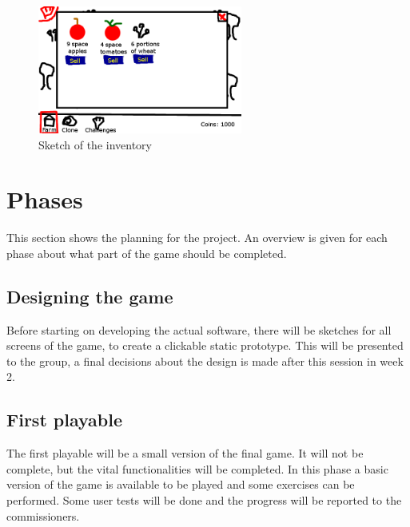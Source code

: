 \documentclass[a4paper,11pt,notitlepage]{report}
\begin{document}
\begin{figure}[h]
	\centering
		\includegraphics[width=0.60\textwidth]{Images/sketch-inventory.png}
	\caption{Sketch of the inventory}
	\label{fig:sketch-inventory}
\end{figure}

\section{Phases}
This section shows the planning for the project. An overview is given for each phase about what part of the game should be completed. 
\subsection{Designing the game}
Before starting on developing the actual software, there will be sketches for all screens of the game, to create a clickable static prototype. This will be presented to the group, a final decisions about the design is made after this session in week 2.
\subsection{First playable}
The first playable will be a small version of the final game. It will not be complete, but the vital functionalities will be completed. In this phase a basic version of the game is available to be played and some exercises can be performed. Some user tests will be done and the progress will be reported to the commissioners.
\end{document}
